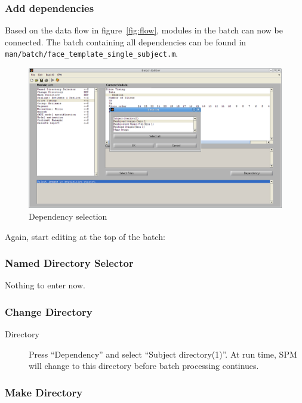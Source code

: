 \subsubsection{Add dependencies}

Based on the data flow in figure~\ref{fig:flow}, modules in the batch can now
be connected. The batch containing all dependencies can be found in
\verb|man/batch/face_template_single_subject.m|.

\begin{figure}[htbp]
  \centering
  \includegraphics[width=\textwidth]{batch/batch_dependencies}
  \caption{Dependency selection}
  \label{fig:batch_dependency}
\end{figure}

Again, start editing at the top of the batch:

\subsubsection*{Named Directory Selector}

Nothing to enter now.

\subsubsection*{Change Directory}

\begin{description}
\item[Directory] Press ``Dependency'' and select ``Subject
  directory(1)''. At run time, SPM will change to this directory before batch
  processing continues.
\end{description}

\subsubsection*{Make Directory}


